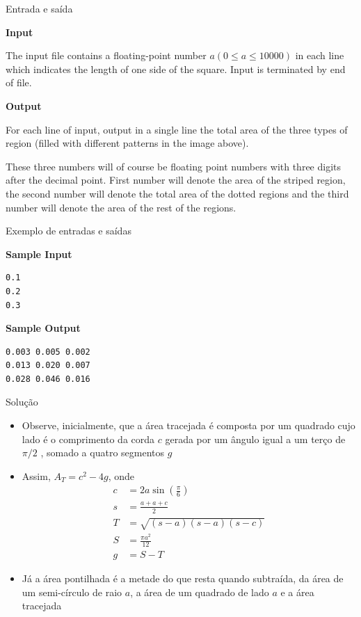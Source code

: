 \begin{frame}[fragile]{Entrada e saída}

\textbf{Input}

The input file contains a floating-point number
$a (0 \leq a \leq 10000)$ in each line which indicates
the length of one side of the square. Input is
terminated by end of file.

\textbf{Output}

For each line of input, output in a single line
the total area of the three types of region (filled with different patterns in the image above).

These three numbers will of course be floating point numbers with three digits after the decimal
point. First number will denote the area of the striped region, the second number will denote the total
area of the dotted regions and the third number will denote the area of the rest of the regions.
\end{frame}

\begin{frame}[fragile]{Exemplo de entradas e saídas}

\begin{minipage}[t]{0.5\textwidth}
\textbf{Sample Input}
\begin{verbatim}
0.1
0.2
0.3
\end{verbatim}
\end{minipage}
\begin{minipage}[t]{0.45\textwidth}
\textbf{Sample Output}
\begin{verbatim}
0.003 0.005 0.002
0.013 0.020 0.007
0.028 0.046 0.016
\end{verbatim}
\end{minipage}
\end{frame}

\begin{frame}[fragile]{Solução}

    \begin{itemize}
        \item Observe, inicialmente, que a área tracejada é composta por um quadrado cujo lado 
            é o comprimento da corda $c$ gerada por um ângulo igual a um terço de $\pi/2$ , somado 
            a quatro segmentos $g$
        \pause

        \item Assim, $A_T = c^2 - 4g$, onde
        \begin{align*}
            c &= 2a\sin\left(\frac{\pi}{6}\right) \\
            s &= \frac{a + a + c}{2} \\
            T &= \sqrt{(s - a)(s - a)(s - c)} \\
            S &= \frac{\pi a^2}{12}  \\
            g &= S - T
        \end{align*}
        \pause

        \item Já a área pontilhada é a metade do que resta quando subtraída, da área de um 
            semi-círculo de raio $a$, a área de um quadrado de lado $a$ e a área tracejada
    \end{itemize}

\end{frame}


